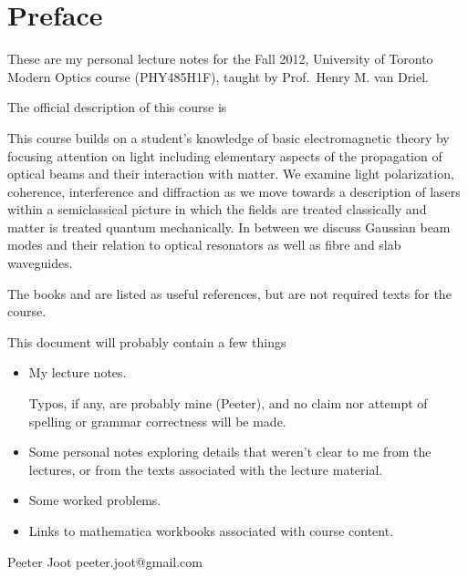 \chapter*{Preface}\normalsize

These are my personal lecture notes for the Fall 2012, University of Toronto Modern Optics course (PHY485H1F), taught by Prof.\ Henry M. van Driel.

The official description of this course is

This course builds on a student's knowledge of basic electromagnetic theory by focusing attention on light including elementary aspects of the propagation of optical beams and their interaction with matter.  We examine light polarization, coherence, interference and diffraction as we move towards a description of lasers within a semiclassical picture in which the fields are treated classically and matter is treated quantum mechanically.  In between we discuss Gaussian beam modes and their relation to optical resonators as well as fibre and slab waveguides.

The books \cite{hecht2002optics} and \cite{saleh1991fundamentals} are listed as useful references, but are not required texts for the course. 

This document will probably contain a few things

\begin{itemize}
\item My lecture notes.

Typos, if any, are probably mine (Peeter), and no claim nor attempt of spelling or grammar correctness will be made.

\item Some personal notes exploring details that weren't clear to me from the lectures, or from the texts associated with the lecture material.

\item Some worked problems.

\item Links to mathematica workbooks associated with course content.

\end{itemize}

Peeter Joot  \quad peeter.joot@gmail.com 

